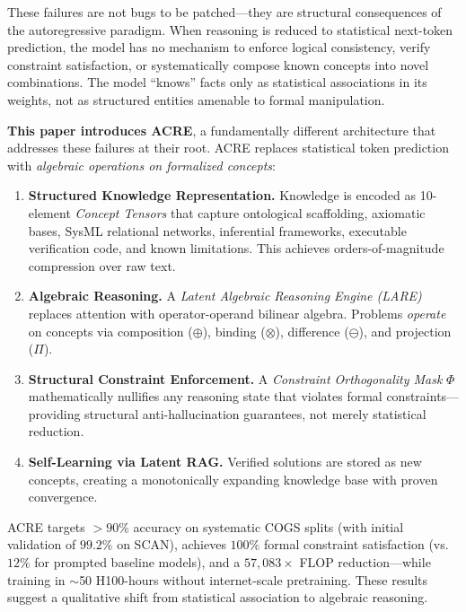 \documentclass{article}
\begin{document}
These failures are not bugs to be patched---they are structural consequences of the autoregressive paradigm. When reasoning is reduced to statistical next-token prediction, the model has no mechanism to enforce logical consistency, verify constraint satisfaction, or systematically compose known concepts into novel combinations. The model ``knows'' facts only as statistical associations in its weights, not as structured entities amenable to formal manipulation.

\textbf{This paper introduces ACRE}, a fundamentally different architecture that addresses these failures at their root. ACRE replaces statistical token prediction with \emph{algebraic operations on formalized concepts}:

\begin{enumerate}[leftmargin=*]
    \item \textbf{Structured Knowledge Representation.} Knowledge is encoded as 10-element \emph{Concept Tensors} that capture ontological scaffolding, axiomatic bases, SysML relational networks, inferential frameworks, executable verification code, and known limitations. This achieves orders-of-magnitude compression over raw text.
    
    \item \textbf{Algebraic Reasoning.} A \emph{Latent Algebraic Reasoning Engine (LARE)} replaces attention with operator-operand bilinear algebra. Problems \emph{operate} on concepts via composition ($\oplus$), binding ($\otimes$), difference ($\ominus$), and projection ($\Pi$).
    
    \item \textbf{Structural Constraint Enforcement.} A \emph{Constraint Orthogonality Mask} $\Phi$ mathematically nullifies any reasoning state that violates formal constraints---providing structural anti-hallucination guarantees, not merely statistical reduction.
    
    \item \textbf{Self-Learning via Latent RAG.} Verified solutions are stored as new concepts, creating a monotonically expanding knowledge base with proven convergence.
\end{enumerate}

ACRE targets $>90\%$ accuracy on systematic COGS splits (with initial validation of $99.2\%$ on SCAN), achieves $100\%$ formal constraint satisfaction (vs.\ $12\%$ for prompted baseline models), and a $57{,}083\times$ FLOP reduction---while training in $\sim$50 H100-hours without internet-scale pretraining. These results suggest a qualitative shift from statistical association to algebraic reasoning.
\end{document}
